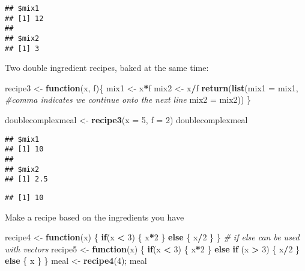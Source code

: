 \documentclass[]{article}
\newenvironment{Shaded}{\begin{snugshade}}{\end{snugshade}}
\newcommand{\KeywordTok}[1]{\textcolor[rgb]{0.13,0.29,0.53}{\textbf{#1}}}
\newcommand{\DataTypeTok}[1]{\textcolor[rgb]{0.13,0.29,0.53}{#1}}
\newcommand{\DecValTok}[1]{\textcolor[rgb]{0.00,0.00,0.81}{#1}}
\newcommand{\StringTok}[1]{\textcolor[rgb]{0.31,0.60,0.02}{#1}}
\newcommand{\CommentTok}[1]{\textcolor[rgb]{0.56,0.35,0.01}{\textit{#1}}}
\newcommand{\ControlFlowTok}[1]{\textcolor[rgb]{0.13,0.29,0.53}{\textbf{#1}}}
\newcommand{\OperatorTok}[1]{\textcolor[rgb]{0.81,0.36,0.00}{\textbf{#1}}}
\newcommand{\NormalTok}[1]{#1}
\begin{document}
\begin{verbatim}
## $mix1
## [1] 12
## 
## $mix2
## [1] 3
\end{verbatim}

Two double ingredient recipes, baked at the same time:

\begin{Shaded}
\begin{Highlighting}[]
\NormalTok{recipe3 <-}\StringTok{ }\ControlFlowTok{function}\NormalTok{(x, f)\{}
\NormalTok{  mix1 <-}\StringTok{ }\NormalTok{x}\OperatorTok{*}\NormalTok{f}
\NormalTok{  mix2 <-}\StringTok{ }\NormalTok{x}\OperatorTok{/}\NormalTok{f}
  \KeywordTok{return}\NormalTok{(}\KeywordTok{list}\NormalTok{(}\DataTypeTok{mix1 =}\NormalTok{ mix1, }\CommentTok{#comma indicates we continue onto the next line}
              \DataTypeTok{mix2 =}\NormalTok{ mix2))}
\NormalTok{\}}

\NormalTok{doublecomplexmeal <-}\StringTok{ }\KeywordTok{recipe3}\NormalTok{(}\DataTypeTok{x =} \DecValTok{5}\NormalTok{, }\DataTypeTok{f =} \DecValTok{2}\NormalTok{)}
\NormalTok{doublecomplexmeal}
\end{Highlighting}
\end{Shaded}

\begin{verbatim}
## $mix1
## [1] 10
## 
## $mix2
## [1] 2.5
\end{verbatim}

\begin{Shaded}
\end{Shaded}

\begin{verbatim}
## [1] 10
\end{verbatim}

Make a recipe based on the ingredients you have

\begin{Shaded}
\begin{Highlighting}[]
\NormalTok{recipe4 <-}\StringTok{ }\ControlFlowTok{function}\NormalTok{(x) \{}
  \ControlFlowTok{if}\NormalTok{(x }\OperatorTok{<}\StringTok{ }\DecValTok{3}\NormalTok{) \{}
\NormalTok{    x}\OperatorTok{*}\DecValTok{2}
\NormalTok{  \} }
  \ControlFlowTok{else}\NormalTok{ \{}
\NormalTok{    x}\OperatorTok{/}\DecValTok{2}
\NormalTok{  \}}
\NormalTok{\}}
\CommentTok{# if else can be used with vectors}
\NormalTok{recipe5 <-}\StringTok{ }\ControlFlowTok{function}\NormalTok{(x) \{}
  \ControlFlowTok{if}\NormalTok{(x }\OperatorTok{<}\StringTok{ }\DecValTok{3}\NormalTok{) \{}
\NormalTok{    x}\OperatorTok{*}\DecValTok{2}
\NormalTok{  \} }
  \ControlFlowTok{else} \ControlFlowTok{if}\NormalTok{ (x }\OperatorTok{>}\StringTok{ }\DecValTok{3}\NormalTok{) \{}
\NormalTok{    x}\OperatorTok{/}\DecValTok{2}
\NormalTok{  \}}
  \ControlFlowTok{else}\NormalTok{ \{}
\NormalTok{    x}
\NormalTok{  \}}
\NormalTok{\}}
\NormalTok{meal <-}\StringTok{ }\KeywordTok{recipe4}\NormalTok{(}\DecValTok{4}\NormalTok{); meal}
\end{Highlighting}
\end{Shaded}
\end{document}
